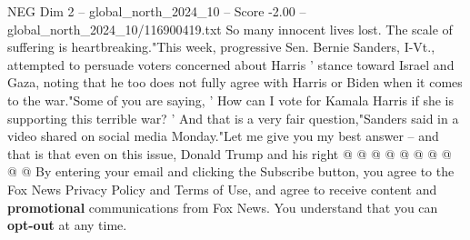 \begin{textsample}{NEG Dim 2 – global\_north\_2024\_10 – Score -2.00 – global\_north\_2024\_10/116900419.txt}
So many innocent lives lost.
The scale of suffering is heartbreaking."This week, progressive Sen.
Bernie Sanders, I-Vt., attempted to persuade voters concerned about Harris ' stance toward Israel and Gaza, noting that he too does not fully agree with Harris or Biden when it comes to the war."Some of you are saying, ' How can I vote for Kamala Harris if she is supporting this terrible war? ' And that is a very fair question,"Sanders said in a video shared on social media Monday."Let me give you my best answer -- and that is that even on this issue, Donald Trump and his right @ @ @ @ @ @ @ @ @ @ By entering your email and clicking the Subscribe button, you agree to the Fox News Privacy Policy and Terms of Use, and agree to receive content and \textbf{promotional} communications from Fox News.
You understand that you can \textbf{opt-out} at any time.

\end{textsample}

